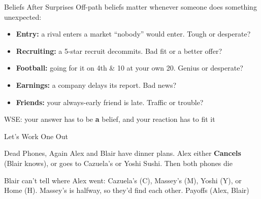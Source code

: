 \begin{frame}{Beliefs After Surprises}
Off-path beliefs matter whenever someone does something unexpected:
\begin{itemize}
    \item \textbf{Entry:} a rival enters a market ``nobody'' would enter. Tough or desperate?
    \item \textbf{Recruiting:} a 5-star recruit decommits. Bad fit or a better offer?
    \item \textbf{Football:} going for it on 4th \& 10 at your own 20. Genius or desperate?
    \item \textbf{Earnings:} a company delays its report. Bad news?
    \item \textbf{Friends:} your always-early friend is late. Traffic or trouble?
\end{itemize}
\bsk
WSE: your answer has to be \textbf{a} belief, and your reaction has to fit it
\vspace{-0.3in}
\end{frame}


\begin{frame}[standout]
Let's Work One Out
\end{frame}

\begin{frame}{Dead Phones, Again}
Alex and Blair have dinner plans. Alex either \textbf{Cancels} (Blair knows), or goes to Cazuela's or Yoshi Sushi. Then both phones die
\bsk
\centering
\phonetree
\bsk
\raggedright
{\footnotesize Blair can't tell where Alex went: Cazuela's (C), Massey's (M), Yoshi (Y), or Home (H). Massey's is halfway, so they'd find each other. Payoffs (Alex, Blair)}
\vspace{-0.3in}
\end{frame}

